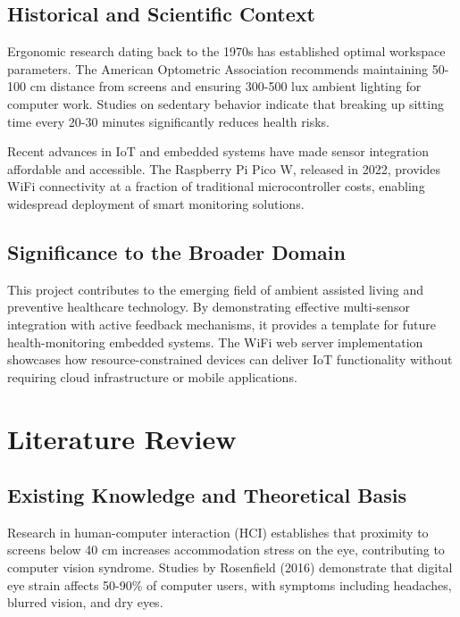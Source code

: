 \documentclass[12pt,a4paper]{article}
\begin{document}
\subsection{Historical and Scientific Context}

Ergonomic research dating back to the 1970s has established optimal workspace parameters. The American Optometric Association recommends maintaining 50-100 cm distance from screens and ensuring 300-500 lux ambient lighting for computer work. Studies on sedentary behavior indicate that breaking up sitting time every 20-30 minutes significantly reduces health risks.

Recent advances in IoT and embedded systems have made sensor integration affordable and accessible. The Raspberry Pi Pico W, released in 2022, provides WiFi connectivity at a fraction of traditional microcontroller costs, enabling widespread deployment of smart monitoring solutions.

\subsection{Significance to the Broader Domain}

This project contributes to the emerging field of ambient assisted living and preventive healthcare technology. By demonstrating effective multi-sensor integration with active feedback mechanisms, it provides a template for future health-monitoring embedded systems. The WiFi web server implementation showcases how resource-constrained devices can deliver IoT functionality without requiring cloud infrastructure or mobile applications.

\section{Literature Review}

\subsection{Existing Knowledge and Theoretical Basis}

Research in human-computer interaction (HCI) establishes that proximity to screens below 40 cm increases accommodation stress on the eye, contributing to computer vision syndrome. Studies by Rosenfield (2016) demonstrate that digital eye strain affects 50-90\% of computer users, with symptoms including headaches, blurred vision, and dry eyes.
\end{document}
